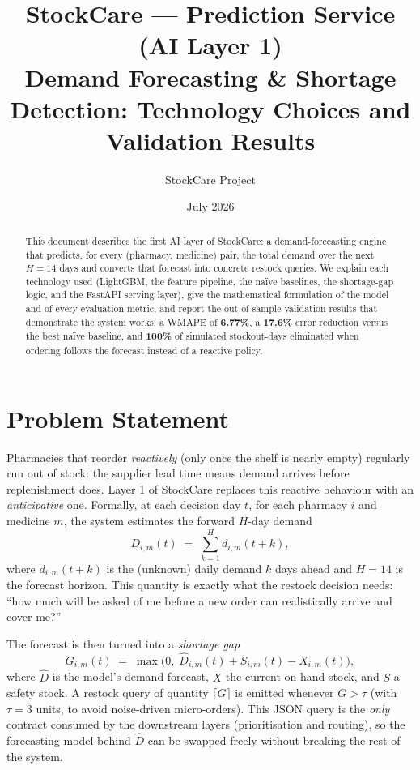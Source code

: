 \documentclass[11pt,a4paper]{article}
\title{\textbf{StockCare --- Prediction Service (AI Layer 1)}\\
\large Demand Forecasting \& Shortage Detection: Technology Choices and Validation Results}
\author{StockCare Project}
\date{July 2026}
\begin{document}
\maketitle

\begin{abstract}
This document describes the first AI layer of StockCare: a demand-forecasting engine that predicts, for every (pharmacy, medicine) pair, the total demand over the next $H=14$ days and converts that forecast into concrete restock queries. We explain each technology used (LightGBM, the feature pipeline, the na\"ive baselines, the shortage-gap logic, and the FastAPI serving layer), give the mathematical formulation of the model and of every evaluation metric, and report the out-of-sample validation results that demonstrate the system works: a WMAPE of \textbf{6.77\%}, a \textbf{17.6\%} error reduction versus the best na\"ive baseline, and \textbf{100\%} of simulated stockout-days eliminated when ordering follows the forecast instead of a reactive policy.
\end{abstract}

\tableofcontents

\section{Problem Statement}

Pharmacies that reorder \emph{reactively} (only once the shelf is nearly empty) regularly run out of stock: the supplier lead time means demand arrives before replenishment does. Layer 1 of StockCare replaces this reactive behaviour with an \emph{anticipative} one. Formally, at each decision day $t$, for each pharmacy $i$ and medicine $m$, the system estimates the forward $H$-day demand
\begin{equation}
D_{i,m}(t) \;=\; \sum_{k=1}^{H} d_{i,m}(t+k),
\label{eq:target}
\end{equation}
where $d_{i,m}(t+k)$ is the (unknown) daily demand $k$ days ahead and $H=14$ is the forecast horizon. This quantity is exactly what the restock decision needs: ``how much will be asked of me before a new order can realistically arrive and cover me?''

The forecast is then turned into a \emph{shortage gap}
\begin{equation}
G_{i,m}(t) \;=\; \max\!\bigl(0,\; \widehat{D}_{i,m}(t) + S_{i,m}(t) - X_{i,m}(t)\bigr),
\label{eq:gap}
\end{equation}
where $\widehat{D}$ is the model's demand forecast, $X$ the current on-hand stock, and $S$ a safety stock. A restock query of quantity $\lceil G \rceil$ is emitted whenever $G > \tau$ (with $\tau = 3$ units, to avoid noise-driven micro-orders). This JSON query is the \emph{only} contract consumed by the downstream layers (prioritisation and routing), so the forecasting model behind $\widehat{D}$ can be swapped freely without breaking the rest of the system.
\end{document}
